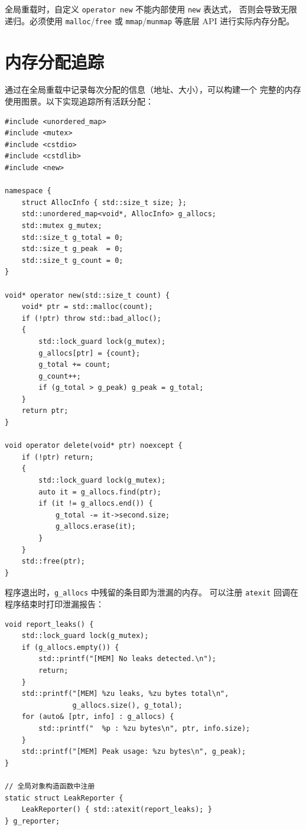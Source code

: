 \documentclass[12pt,a4paper,fontset=fandol]{ctexbook}
\begin{document}
\begin{warning}
全局重载时，自定义 \texttt{operator new} 不能内部使用 \texttt{new} 表达式，
否则会导致无限递归。必须使用 \texttt{malloc}/\allowbreak{}\texttt{free} 或
\texttt{mmap}/\allowbreak{}\texttt{munmap} 等底层 API 进行实际内存分配。
\end{warning}

\section{内存分配追踪}

通过在全局重载中记录每次分配的信息（地址、大小），可以构建一个
完整的内存使用图景。以下实现追踪所有活跃分配：

\begin{lstlisting}
#include <unordered_map>
#include <mutex>
#include <cstdio>
#include <cstdlib>
#include <new>

namespace {
    struct AllocInfo { std::size_t size; };
    std::unordered_map<void*, AllocInfo> g_allocs;
    std::mutex g_mutex;
    std::size_t g_total = 0;
    std::size_t g_peak  = 0;
    std::size_t g_count = 0;
}

void* operator new(std::size_t count) {
    void* ptr = std::malloc(count);
    if (!ptr) throw std::bad_alloc();
    {
        std::lock_guard lock(g_mutex);
        g_allocs[ptr] = {count};
        g_total += count;
        g_count++;
        if (g_total > g_peak) g_peak = g_total;
    }
    return ptr;
}

void operator delete(void* ptr) noexcept {
    if (!ptr) return;
    {
        std::lock_guard lock(g_mutex);
        auto it = g_allocs.find(ptr);
        if (it != g_allocs.end()) {
            g_total -= it->second.size;
            g_allocs.erase(it);
        }
    }
    std::free(ptr);
}
\end{lstlisting}

程序退出时，\texttt{g\_allocs} 中残留的条目即为泄漏的内存。
可以注册 \texttt{atexit} 回调在程序结束时打印泄漏报告：

\begin{lstlisting}
void report_leaks() {
    std::lock_guard lock(g_mutex);
    if (g_allocs.empty()) {
        std::printf("[MEM] No leaks detected.\n");
        return;
    }
    std::printf("[MEM] %zu leaks, %zu bytes total\n",
                g_allocs.size(), g_total);
    for (auto& [ptr, info] : g_allocs) {
        std::printf("  %p : %zu bytes\n", ptr, info.size);
    }
    std::printf("[MEM] Peak usage: %zu bytes\n", g_peak);
}

// 全局对象构造函数中注册
static struct LeakReporter {
    LeakReporter() { std::atexit(report_leaks); }
} g_reporter;
\end{lstlisting}
\end{document}
